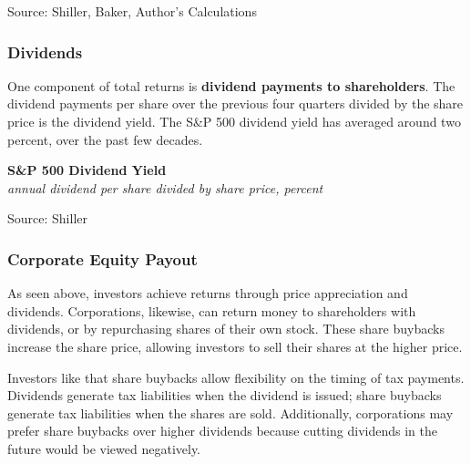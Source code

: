 \documentclass{report}
\makeatletter
\newcommand{\tbllink}[1]{\href{https://raw.githubusercontent.com/bdecon/US-chartbook/master/chartbook/data/#1}{\faTable}}
\newcommand*\short[1]{\expandafter\@gobbletwo\number\numexpr#1\relax}
\newcommand{\dateaxisticks}{
		date coordinates in=x, axis line style={draw=none},
		xmax={2023-11-30},
		max space between ticks=40,	    
		xtick={{1990-01-01}, {1992-01-01}, {1994-01-01}, 
			{1996-01-01}, {1998-01-01}, {2000-01-01}, 
			{2002-01-01}, {2004-01-01}, {2006-01-01},
			{2008-01-01}, {2010-01-01}, {2012-01-01}, {2014-01-01},
		    {2016-01-01}, {2018-01-01}, {2020-01-01}, {2022-01-01}, 
		    {2024-01-01}, {2026-01-01}},
		minor xtick={{1989-01-01}, {1991-01-01}, {1993-01-01},
			{1995-01-01}, {1997-01-01}, {1999-01-01}, 
			{2001-01-01}, {2003-01-01}, {2005-01-01}, {2007-01-01},
		    {2009-01-01}, {2011-01-01}, {2013-01-01}, {2015-01-01},
		    {2017-01-01}, {2019-01-01}, {2021-01-01}, {2023-01-01}, 
		    {2025-01-01}, {2027-01-01}},
		enlarge y limits={0.06}, enlarge x limits={0.01},
		xticklabel style={align=center, yshift=-2pt}, tick label style={inner sep=0pt},
		}
\newcommand{\bbar}[2]{extra #1 ticks = {{#2}}, extra #1 tick labels = ,
		extra #1 tick style = {grid=major, grid style={thick, black!25}},}
\newcommand{\thickline}[4]{\addplot[ultra thick, no markers, color=#1] 
		table [x=#2, y=#3, col sep=comma] {#4};	}
\newcommand{\rbars}{
		\fill[color=black!10] (axis cs:{1990-07-01},\pgfkeysvalueof{/pgfplots/ymin}) rectangle 
			(axis cs:{1991-03-01}, \pgfkeysvalueof{/pgfplots/ymax});
		\fill[color=black!10] (axis cs:{2007-12-01},\pgfkeysvalueof{/pgfplots/ymin}) rectangle 
			(axis cs:{2009-07-01}, \pgfkeysvalueof{/pgfplots/ymax});
		\fill[color=black!10] (axis cs:{2001-03-01},\pgfkeysvalueof{/pgfplots/ymin}) rectangle 
			(axis cs:{2001-11-01}, \pgfkeysvalueof{/pgfplots/ymax});
		\fill[color=black!10] (axis cs:{2020-02-01},\pgfkeysvalueof{/pgfplots/ymin}) rectangle 
			(axis cs:{2020-05-01}, \pgfkeysvalueof{/pgfplots/ymax});}
\makeatother
\begin{document}
{\begin{minipage}{0.76\textwidth}
\footnotesize{Source: Shiller, Baker, Author's Calculations} \hfill \tbllink{sp500rr.csv}
\vspace{1mm}

\subsubsection*{Dividends}
\small One component of total returns is \textbf{dividend payments to shareholders}. The dividend payments per share over the previous four quarters divided by the share price is the dividend yield. The S\&P 500 dividend yield has averaged around two percent, over the past few decades.


\vspace{1mm}

\normalsize \textbf{S\&P 500 Dividend Yield}\\
\footnotesize{\textit{annual dividend per share divided by share price, percent}}
\vspace{2.9cm}

\hspace{1mm} 

\footnotesize{Source: Shiller} \hfill \tbllink{sp500dy.csv}
\end{minipage}
\newpage
\begin{minipage}{0.76\textwidth}  
\subsubsection*{Corporate Equity Payout}
\small As seen above, investors achieve returns through price appreciation and dividends. Corporations, likewise, can return money to shareholders with dividends, or by repurchasing shares of their own stock. These share buybacks increase the share price, allowing investors to sell their shares at the higher price. 

Investors like that share buybacks allow flexibility on the timing of tax payments. Dividends generate tax liabilities when the dividend is issued; share buybacks generate tax liabilities when the shares are sold. Additionally, corporations may prefer share buybacks over higher dividends because cutting dividends in the future would be viewed negatively. 


\end{minipage}}
\end{document}
